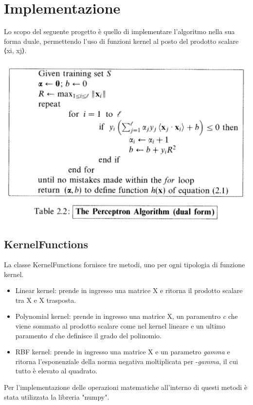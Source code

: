 \documentclass{article}
\begin{document}
	\section{Implementazione} 
	Lo scopo del seguente progetto è quello di implementare l'algoritmo nella sua forma duale, permettendo l'uso di funzioni kernel al posto del prodotto
	scalare ⟨xi, xj⟩.
	\begin{center}
		\includegraphics[width=0.7\linewidth]{pseudocodice_perceptron.png}
		\label{The Perceptron Algorithm (dual form)}
	\end{center}
	\subsection{KernelFunctions}
	La classe KernelFunctions fornisce tre metodi, uno per ogni tipologia di funzione kernel. 
	\begin{itemize}
		\item Linear kernel: prende in ingresso una matrice X e ritorna il prodotto scalare tra X e X trasposta.
		\item Polynomial kernel: prende in ingresso una matrice X, un paramentro \textit{c} che viene sommato al prodotto scalare come nel kernel lineare e un ultimo paramento \textit{d} che definisce il grado del polinomio. 
		\item RBF kernel: prende in ingresso una matrice X e un parametro \textit{gamma} e ritorna l'esponenziale della norma negativa moltiplicata per -\textit{gamma}, il cui tutto è elevato al quadrato.
	\end{itemize}
	Per l'implementazione delle operazioni matematiche all'interno di questi metodi è stata utilizzata la libreria "numpy".
\end{document}
